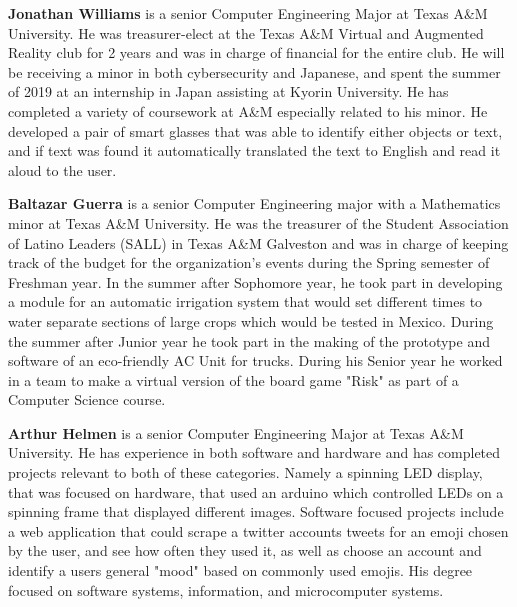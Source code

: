 \documentclass[letterpaper,12pt]{article}
\begin{document}
\textbf{Jonathan Williams} is a senior Computer Engineering Major at Texas A\&M University. He was treasurer-elect at the Texas A\&M Virtual and Augmented Reality club for 2 years and was in charge of financial for the entire club. He will be receiving a minor in both cybersecurity and Japanese, and spent the summer of 2019 at an internship in Japan assisting at Kyorin University. He has completed a variety of coursework  at A\&M especially related to his minor. He developed a pair of smart glasses that was able to identify either objects or text, and if text was found it automatically translated the text to English and read it aloud to the user. \par

\textbf{Baltazar Guerra} is a senior Computer Engineering major with a Mathematics minor at Texas A\&M University. He was the treasurer of the Student Association of Latino Leaders (SALL) in Texas A\&M Galveston and was in charge of keeping track of the budget for the organization's events during the Spring semester of Freshman year. In the summer after Sophomore year, he took part in developing a module for an automatic irrigation system that would set different times to water separate sections of large crops which would be tested in Mexico. During the summer after Junior year he took part in the making of the prototype and software of an eco-friendly AC Unit for trucks. During his Senior year he worked in a team to make a virtual version of the board game "Risk" as part of a Computer Science course. \par

\textbf{Arthur Helmen} is a senior Computer Engineering Major at Texas A\&M University. He has experience in both software and hardware and has completed projects relevant to both of these categories. Namely a spinning LED display, that was focused on hardware, that used an arduino which controlled LEDs on a spinning frame that displayed different images. Software focused projects include a web application that could scrape a twitter accounts tweets for an emoji chosen by the user, and see how often they used it, as well as choose an account and identify a users general "mood" based on commonly used emojis. His degree focused on software systems, information, and microcomputer systems.\par
\end{document}
